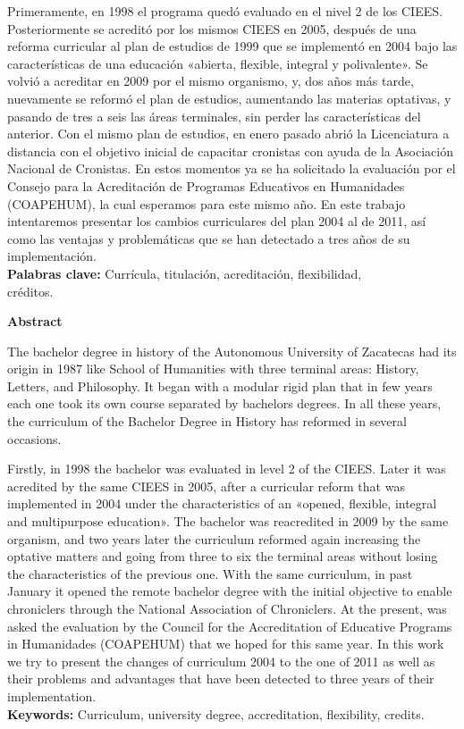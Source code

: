 Primeramente, en 1998 el programa quedó evaluado en el nivel 2 de los 
CIEES. Posteriormente se acreditó por los mismos CIEES en 2005, después 
de una reforma curricular al plan de estudios de 1999 que se implementó 
en 2004 bajo las características de una educación «abierta, flexible, 
integral y polivalente». Se volvió a acreditar en 2009 por el mismo organismo, 
y, dos años más tarde, nuevamente se reformó el plan de estudios, 
aumentando las materias optativas, y pasando de tres a seis las áreas 
terminales, sin perder las características del anterior. Con el mismo 
plan de estudios, en enero pasado abrió la Licenciatura a distancia con 
el objetivo inicial de capacitar cronistas con ayuda de la Asociación 
Nacional de Cronistas. En estos momentos ya se ha solicitado la evaluación 
por el Consejo para la Acreditación de Programas Educativos en 
Humanidades (COAPEHUM), la cual esperamos para este mismo año. En este 
trabajo intentaremos presentar los cambios curriculares del plan 2004 al 
de 2011, así como las ventajas y problemáticas que se han detectado a 
tres años de su implementación.\\ 
\textbf{Palabras clave:} Currícula, titulación, acreditación, flexibilidad,\\
créditos.


\bigskip
\textbf{Abstract}

The bachelor degree in history of the Autonomous University of 
Zacatecas had its origin in 1987 like School of Humanities with three 
terminal areas: History, Letters, and Philosophy. It began with a 
modular rigid plan that in few years each one took its own course 
separated by bachelors degrees. In all these years, the curriculum of 
the Bachelor Degree in History has reformed in several occasions.

\begin{sloppypar}
Firstly, in 1998 the bachelor was evaluated in level 2 of the CIEES. 
Later it was acredited by the same CIEES in 2005, after a curricular 
reform that was implemented in 2004 under the characteristics of an 
«opened, flexible, integral and multipurpose education».  The bachelor 
was reacredited in 2009 by the same organism, and two years later the 
curriculum reformed again increasing the optative matters and going 
from three to six the terminal areas without losing the characteristics 
of the previous one. With the same curriculum, in past January it 
opened the remote bachelor degree with the initial objective to enable 
chroniclers through the National Association of Chroniclers. At the 
present, was asked the evaluation by the Council for the Accreditation 
of Educative Programs in Humanidades (COAPEHUM) that we hoped for this 
same year. In this work we try to present the changes of curriculum 
2004 to the one of 2011 as well as their problems and advantages that 
have been detected to three years of their implementation.\\
\textbf{Keywords:} Curriculum, university degree,
accreditation, flexibility, credits.
\end{sloppypar}

